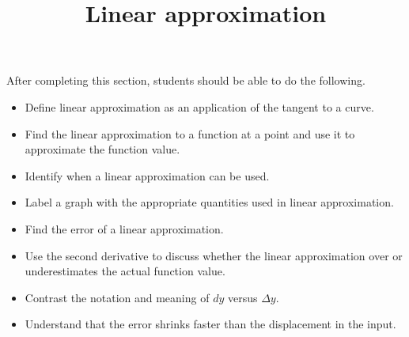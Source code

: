 \documentclass{ximera}
\title{Linear approximation}
\begin{document}
\begin{abstract}
\end{abstract}

\maketitle

\begin{sectionOutcomes}

After completing this section, students should be able to do the following.

\begin{itemize}
	\item Define linear approximation as an application of the tangent to a curve.
	\item Find the linear approximation to a function at a point and use it to approximate the function value.
	\item Identify when a linear approximation can be used.
	\item Label a graph with the appropriate quantities used in linear approximation.
	\item Find the error of a linear approximation.
	\item Use the second derivative to discuss whether the linear approximation over or underestimates the actual function value.
	\item Contrast the notation and meaning of $dy$ versus $\Delta y$.
	\item Understand that the error shrinks faster than the displacement in the input.
\end{itemize}

\end{sectionOutcomes}
\end{document}

